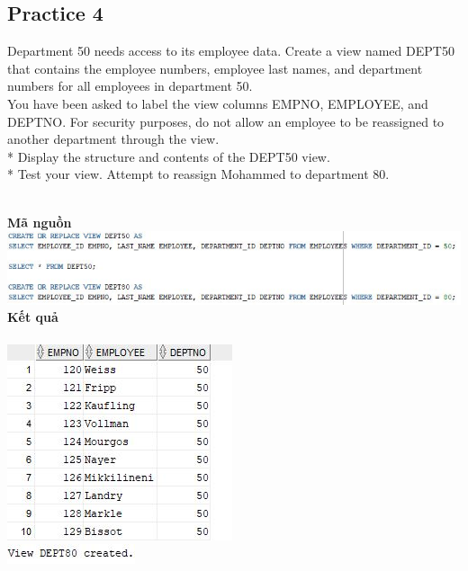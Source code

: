 \documentclass[12pt,a4paper]{report}
\begin{document}
\subsection{Practice 4}
\begin{boxedminipage}[t]{15.5cm}
Department 50 needs access to its employee data. Create a view named DEPT50 that contains 
the employee numbers, employee last names, and department numbers for all employees in department 50. \\
You have been asked to label the view columns EMPNO, EMPLOYEE, and DEPTNO. For security purposes, do not allow an employee to be reassigned to another department through the view.\\
* Display the structure and contents of the DEPT50 view.\\
* Test your view. Attempt to reassign Mohammed to department 80.
\end{boxedminipage}
\newline
\\
\textbf{Mã nguồn}
\\
\newline
\includegraphics[scale=.78]{p43.jpg}\\
\textbf{Kết quả}\\\\
\includegraphics[scale=1]{kp43.jpg}\\
\includegraphics[scale=1]{kp432.jpg}
\end{document}
